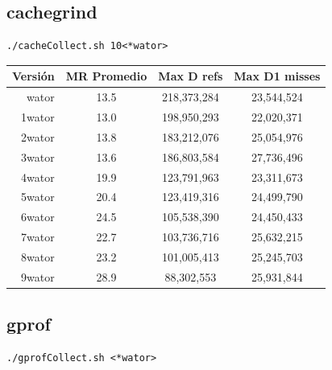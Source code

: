 \documentclass[a4paper,10pt]{article}
\begin{document}
\subsection{cachegrind}

\begin{verbatim}
./cacheCollect.sh 10<*wator>
\end{verbatim}

\begin{center}
  \begin{tabular}{| r | c | c | c |}
    \hline
    Versi\'on 	&	MR Promedio	& 	Max D refs	&	Max D1 misses	\\ \hline
	wator	&	13.5	&	218,373,284	&	23,544,524	\\ \hline
	1wator	&	13.0	&	198,950,293 	&	22,020,371	\\ \hline
	2wator	&	13.8	&	183,212,076	&	25,054,976	\\ \hline
	3wator	&	13.6	&	186,803,584	&	27,736,496	\\ \hline
	4wator	&	19.9	&	123,791,963	&	23,311,673	\\ \hline
	5wator	&	20.4	&	123,419,316	&	24,499,790	\\ \hline
	6wator	&	24.5	&	105,538,390	&	24,450,433	\\ \hline
	7wator	&	22.7	&	103,736,716	&	25,632,215	\\ \hline
	8wator	&	23.2	&	101,005,413	&	25,245,703	\\ \hline
	9wator	&	28.9	&	88,302,553	&	25,931,844	\\ \hline
  \end{tabular}
\end{center}

\newpage

\subsection{gprof}

\begin{verbatim}
./gprofCollect.sh <*wator>
\end{verbatim}
\end{document}
